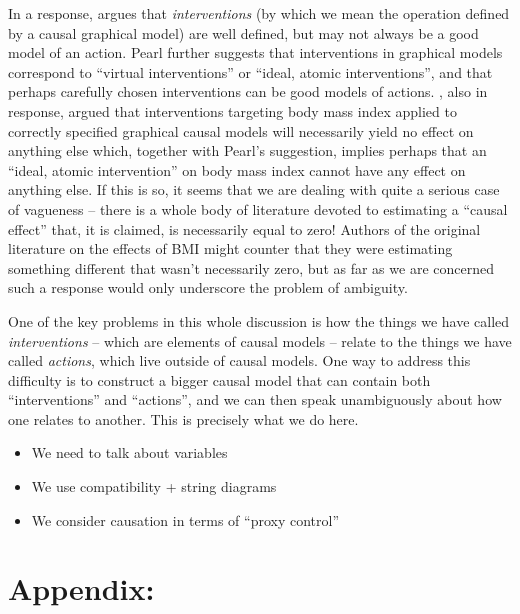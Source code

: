 \documentclass{article}
\theoremstyle{plain}
\theoremstyle{definition}
\begin{document}
In a response, \citet{pearl_does_2018} argues that \emph{interventions} (by which we mean the operation defined by a causal graphical model) are well defined, but may not always be a good model of an action. Pearl further suggests that interventions in graphical models correspond to ``virtual interventions'' or ``ideal, atomic interventions'', and that perhaps carefully chosen interventions can be good models of actions. \citet{shahar_association_2009}, also in response, argued that interventions targeting body mass index applied to correctly specified graphical causal models will necessarily yield no effect on anything else which, together with Pearl's suggestion, implies perhaps that an ``ideal, atomic intervention'' on body mass index cannot have any effect on anything else. If this is so, it seems that we are dealing with quite a serious case of vagueness -- there is a whole body of literature devoted to estimating a ``causal effect'' that, it is claimed, is necessarily equal to zero! Authors of the original literature on the effects of BMI might counter that they were estimating something different that wasn't necessarily zero, but as far as we are concerned such a response would only underscore the problem of ambiguity.

One of the key problems in this whole discussion is how the things we have called \emph{interventions} -- which are elements of causal models -- relate to the things we have called \emph{actions}, which live outside of causal models. One way to address this difficulty is to construct a bigger causal model that can contain both ``interventions'' and ``actions'', and we can then speak unambiguously about how one relates to another. This is precisely what we do here.

\begin{itemize}
  \item We need to talk about variables
  \item We use compatibility + string diagrams
  \item We consider causation in terms of ``proxy control''
\end{itemize}








% 
% 
% 
% 
% 




\appendix
\newpage
\section*{Appendix:}

% 
\end{document}
